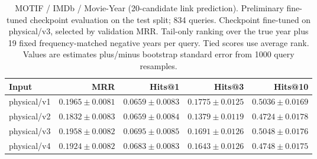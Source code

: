 \begin{table}[t]
\centering
\small
\begin{tabular}{lrrrr}
\toprule
Input & MRR & Hits@1 & Hits@3 & Hits@10 \\
\midrule
physical/v1 & $0.1965 \pm 0.0081$ & $0.0659 \pm 0.0083$ & $0.1775 \pm 0.0125$ & $0.5036 \pm 0.0169$ \\
physical/v2 & $0.1832 \pm 0.0083$ & $0.0659 \pm 0.0084$ & $0.1379 \pm 0.0119$ & $0.4724 \pm 0.0178$ \\
physical/v3 & $0.1958 \pm 0.0082$ & $0.0695 \pm 0.0085$ & $0.1691 \pm 0.0126$ & $0.5048 \pm 0.0176$ \\
physical/v4 & $0.1924 \pm 0.0082$ & $0.0683 \pm 0.0083$ & $0.1643 \pm 0.0126$ & $0.4748 \pm 0.0175$ \\
\bottomrule
\end{tabular}
\caption{MOTIF / IMDb / Movie-Year (20-candidate link prediction). Preliminary fine-tuned checkpoint evaluation on the test split; 834 queries. Checkpoint fine-tuned on physical/v3, selected by validation MRR. Tail-only ranking over the true year plus 19 fixed frequency-matched negative years per query. Tied scores use average rank. Values are estimates plus/minus bootstrap standard error from 1000 query resamples.}
\label{tab:motif-movie_year-link_prediction}
\end{table}
